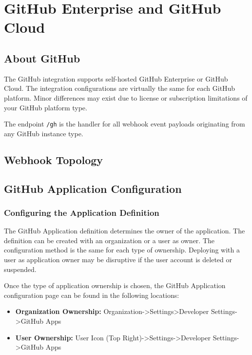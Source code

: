 \chapter{GitHub Enterprise and GitHub Cloud}

\section{About GitHub}

The GitHub integration supports self-hosted GitHub Enterprise or GitHub Cloud.  The integration configurations
are virtually the same for each GitHub platform.  Minor differences may exist due to license or subscription
limitations of your GitHub platform type.  

The \cxoneflow endpoint \texttt{/gh} is the handler for all webhook event
payloads originating from any GitHub instance type.  


\section{Webhook Topology}



\section{GitHub Application Configuration}

\subsection{Configuring the Application Definition}

The GitHub Application definition determines the owner of the application.  The definition can
be created with an organization or a user as owner.  The configuration method is the same
for each type of ownership.  Deploying with a user as application owner may be disruptive if the user
account is deleted or suspended.

Once the type of application ownership is chosen, the GitHub Application configuration page can be found in the following
locations:

\begin{itemize}
    \item \textbf{Organization Ownership:} Organization->Settings>Developer Settings->GitHub Apps
    \item \textbf{User Ownership:} User Icon (Top Right)->Settings->Developer Settings->GitHub Apps
\end{itemize}


